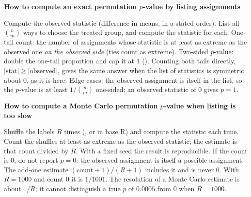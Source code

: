 \documentclass[10pt]{scrartcl}
\newenvironment{howto}[1]{\begin{mdframed}[style=howtostyle]{\color{NavyBlue}\textbf{#1}}\par\vspace{2pt}}{\end{mdframed}}
\begin{document}
\begin{howto}{How to compute an exact permutation $p$-value by listing assignments}
\begin{steps}
  \ii Compute the observed statistic (difference in means, in a stated order).
  \ii List all $\binom{n}{m}$ ways to choose the treated group, and compute the statistic for each.
  \ii One-tail count: the number of assignments whose statistic is at least as extreme as the observed one \emph{on the observed side} (ties count as extreme).
  \ii Two-sided $p$-value: double the one-tail proportion and cap it at $1$ (). Counting both tails directly, $|\text{stat}| \ge |\text{observed}|$, gives the same answer when the list of statistics is symmetric about $0$, as it is here.
  \ii Edge cases: the observed assignment is itself in the list, so the $p$-value is at least $1/\binom nm$ one-sided; an observed statistic of $0$ gives $p = 1$.
\end{steps}
\end{howto}

\begin{howto}{How to compute a Monte Carlo permutation $p$-value when listing is too slow}
\begin{steps}
  \ii Shuffle the labels $R$ times (, or  in base R) and compute the statistic each time.
  \ii Count the shuffles at least as extreme as the observed statistic; the estimate is that count divided by $R$. With a fixed seed the result is reproducible.
  \ii If the count is $0$, do not report $p = 0$: the observed assignment is itself a possible assignment. The add-one estimate $(\text{count} + 1)/(R + 1)$ includes it and is never $0$. With $R = 1000$ and count $0$ it is $1/1001$.
  \ii The resolution of a Monte Carlo estimate is about $1/R$; it cannot distinguish a true $p$ of $0.0005$ from $0$ when $R = 1000$.
\end{steps}
\end{howto}
\end{document}
